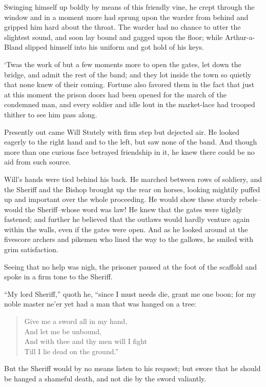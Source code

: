 Swinging himself up boldly by means of this friendly vine, he crept
through the window and in a moment more had sprung upon the warder from
behind and gripped him hard about the throat. The warder had no chance
to utter the slightest sound, and soon lay bound and gagged upon the
floor; while Arthur-a-Bland slipped himself into his uniform and got
hold of his keys.

`Twas the work of but a few moments more to open the gates, let down the
bridge, and admit the rest of the band; and they lot inside the town so
quietly that none knew of their coming. Fortune also favored them in the
fact that just at this moment the prison doors had been opened for the
march of the condemned man, and every soldier and idle lout in the
market-lace had trooped thither to see him pass along.

Presently out came Will Stutely with firm step but dejected air. He
looked eagerly to the right hand and to the left, but saw none of the
band. And though more than one curious face betrayed friendship in it,
he knew there could be no aid from such source.

Will's hands were tied behind his back. He marched between rows of
soldiery, and the Sheriff and the Bishop brought up the rear on horses,
looking mightily puffed up and important over the whole proceeding. He
would show these sturdy rebels--would the Sheriff--whose word was law!
He knew that the gates were tightly fastened; and further he believed
that the outlaws would hardly venture again within the walls, even if
the gates were open. And as he looked around at the fivescore archers
and pikemen who lined the way to the gallows, he smiled with grim
satisfaction.

Seeing that no help was nigh, the prisoner paused at the foot of the
scaffold and spoke in a firm tone to the Sheriff.

``My lord Sheriff,'' quoth he, ``since I must needs die, grant me one
boon; for my noble master ne'er yet had a man that was hanged on a tree:

\begin{quote}
Give me a sword all in my hand,\\
And let me be unbound,\\
And with thee and thy men will I fight\\
Till I lie dead on the ground.”
\end{quote}

But the Sheriff would by no means listen to his request; but swore that
he should be hanged a shameful death, and not die by the sword
valiantly.

